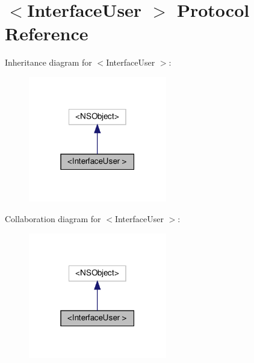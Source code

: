 \hypertarget{protocolInterfaceUser_01-p}{}\section{$<$Interface\+User $>$ Protocol Reference}
\label{protocolInterfaceUser_01-p}


Inheritance diagram for $<$Interface\+User $>$\+:
\nopagebreak
\begin{figure}[H]
\begin{center}
\leavevmode
\includegraphics[width=171pt]{protocolInterfaceUser_01-p__inherit__graph}
\end{center}
\end{figure}


Collaboration diagram for $<$Interface\+User $>$\+:
\nopagebreak
\begin{figure}[H]
\begin{center}
\leavevmode
\includegraphics[width=171pt]{protocolInterfaceUser_01-p__coll__graph}
\end{center}
\end{figure}
